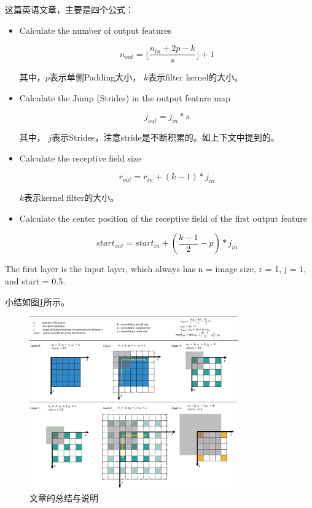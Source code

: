 这篇英语文章，主要是四个公式：
\begin{itemize}
\item Calculate the number of output features

\begin{displaymath}
n_{out} =	\lfloor \frac{n_{in} + 2p - k}{s} \rfloor + 1
\end{displaymath}

其中，$p$表示单侧Padding大小， $k$表示filter kernel的大小。


\item Calculate the Jump (Strides) in the output feature map

\begin{displaymath}
j_{out} = j_{in} * s
\end{displaymath}

其中， $j$表示Strides，注意stride是不断积累的。如上下文中提到的。

\item Calculate the receptive field size

\begin{displaymath}
r_{out} = r_{in} + (k - 1) * j_{in}
\end{displaymath}

$k$表示kernel filter的大小。

\item Calculate the center position of the receptive field of the first output feature

\begin{displaymath}
start_{out} = start_{in} + (\frac{k - 1}{2} - p) * j_{in}
\end{displaymath}

\end{itemize}

The first layer is the input layer, which always has n = image size, r = 1, j = 1, and start = 0.5. 

小结如图\ref{PerceptionField1}所示。
\begin{figure}[!htbp]
\centering
\includegraphics[width=0.8\textwidth]{DLTips/PerceptionField1.png}
\caption{文章的总结与说明}
\label{PerceptionField1}
\end{figure}


